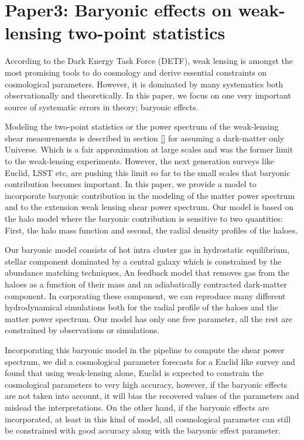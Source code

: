 \chapter{Paper3: Baryonic effects on weak-lensing two-point statistics}\label{paper:baryoniceffects}

According to the Dark Energy Task Force (DETF), weak lensing is amongst the most promising
tools to do cosmology and derive essential constraints on cosmological parameters. 
However, it is dominated by many systematics both observationally and theoretically.
In this paper, we focus on one very important source of systematic errors in theory; baryonic
effects. 

Modeling the two-point statistics or the power spectrum of the weak-lensing shear measurements
is described in section \ref{} for assuming a dark-matter only Universe. Which is a fair approximation
at large scales and was the former limit to the weak-lensing experiments. However, the next
generation surveys like Euclid, LSST etc, are pushing this limit so far to the small scales
that baryonic contribution becomes important. In this paper, we provide a model
to incorporate baryonic contribution in the modeling of the matter power spectrum
and to the extension weak lensing shear power spectrum. Our model is based on 
the halo model where the baryonic contribution is sensitive to two quantities: 
First, the halo mass function and second, the radial density profiles of the haloes.

Our baryonic model consists of hot intra cluster gas in hydrostatic equilibrium, 
stellar component dominated by a central galaxy which is constrained by the abundance
matching techniques, An feedback model that removes gas from the haloes as a function
of their mass and an adiabatically contracted dark-matter component. In corporating
these component, we can reproduce many different hydrodynamical simulations both
for the radial profile of the haloes and the matter power spectrum. Our model has only
one free parameter, all the rest are constrained by observations or simulations. 

Incorporating this baryonic model in the pipeline to compute the shear power spectrum, 
we did a cosmological parameter forecasts for a Euclid like survey and found that using
weak-lensing alone, Euclid is expected to constrain the cosmological parameters to very
high accuracy, however, if the baryonic effects are not taken into account, it will bias
the recovered values of the parameters and mislead the interpretations. On the other hand,
if the baryonic effects are incorporated, at least in this kind of model, all cosmological
parameter can still be constrained with good accuracy along with the baryonic effect
parameter. 




\clearpage
